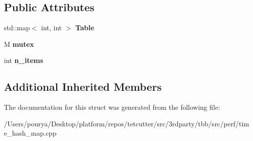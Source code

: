 \subsection*{Public Attributes}
\begin{DoxyCompactItemize}
\item 
\hypertarget{structTestSTLMap_a988593acdf5d59a5b675f29d31d46eb8}{}std\+::map$<$ int, int $>$ {\bfseries Table}\label{structTestSTLMap_a988593acdf5d59a5b675f29d31d46eb8}

\item 
\hypertarget{structTestSTLMap_a7910e516d1e84653d2d81fb4136ac492}{}M {\bfseries mutex}\label{structTestSTLMap_a7910e516d1e84653d2d81fb4136ac492}

\item 
\hypertarget{structTestSTLMap_ae00bd2b67af67091d9c32ad8819a69a0}{}int {\bfseries n\+\_\+items}\label{structTestSTLMap_ae00bd2b67af67091d9c32ad8819a69a0}

\end{DoxyCompactItemize}
\subsection*{Additional Inherited Members}


The documentation for this struct was generated from the following file\+:\begin{DoxyCompactItemize}
\item 
/\+Users/pourya/\+Desktop/platform/repos/tetcutter/src/3rdparty/tbb/src/perf/time\+\_\+hash\+\_\+map.\+cpp\end{DoxyCompactItemize}
